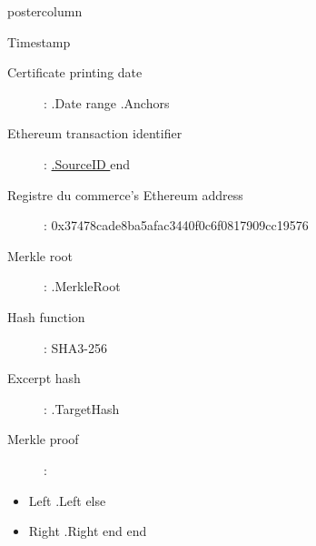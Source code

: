 \documentclass[roundedcorners=true, titleposition=center]{beamerthemeruhuisstijlposter}
\begin{document}
\begin{frame}
\begin{columns}
\begin{column}{0.95\textwidth}
\begin{beamercolorbox}[center, wd=\textwidth]{postercolumn}
\begin{minipage}[T]{0.95\textwidth}
    \hfill
\parbox[t][\columnheight]{\textwidth}{%

\begin{block}{Timestamp}
\begin{description}
    \item [Certificate printing date] :\linebreak
{{ .Date }}
{{ range .Anchors }}
\item [Ethereum transaction identifier] :\linebreak
\href{https://etherscan.io/tx/{{ .SourceID }} }{ {{.SourceID }} }
{{ end }}
\item[Registre du commerce's Ethereum address] :\linebreak
0x37478cade8ba5afac3440f0c6f0817909cc19576
\item[Merkle root] :\linebreak
{{ .MerkleRoot }}
\item[Hash function] : \linebreak
SHA3-256
\item[Excerpt hash] :\linebreak
{{ .TargetHash }}
\item[Merkle proof] :
\end{description}
\begin{itemize}
{{ range .Proof }}
    {{ if .Left }}
        \item Left {{ .Left }}
    {{ else }}
        \item Right {{ .Right }}
    {{ end }}
{{ end }}
\end{itemize}
\end{block}
}
\end{minipage}
\end{beamercolorbox}
\end{column}
\end{columns}
\end{frame}
\end{document}
